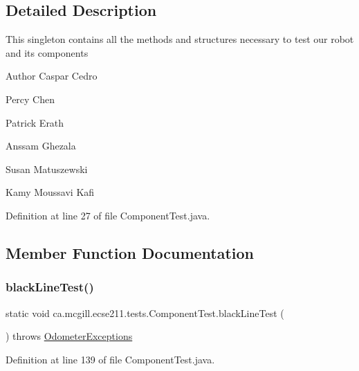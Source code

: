 \subsection{Detailed Description}
This singleton contains all the methods and structures necessary to test our robot and its components

\begin{DoxyAuthor}{Author}
Caspar Cedro 

Percy Chen 

Patrick Erath 

Anssam Ghezala 

Susan Matuszewski 

Kamy Moussavi Kafi 
\end{DoxyAuthor}


Definition at line 27 of file Component\+Test.\+java.



\subsection{Member Function Documentation}
\mbox{\label{enumca_1_1mcgill_1_1ecse211_1_1tests_1_1_component_test_a3f36cee9ca567c845377bec33554ba8b}} 
\subsubsection{\texorpdfstring{black\+Line\+Test()}{blackLineTest()}}
{\footnotesize\ttfamily static void ca.\+mcgill.\+ecse211.\+tests.\+Component\+Test.\+black\+Line\+Test (\begin{DoxyParamCaption}{ }\end{DoxyParamCaption}) throws \hyperlink{classca_1_1mcgill_1_1ecse211_1_1odometer_1_1_odometer_exceptions}{Odometer\+Exceptions}\hspace{0.3cm}{\ttfamily [static]}}



Definition at line 139 of file Component\+Test.\+java.


